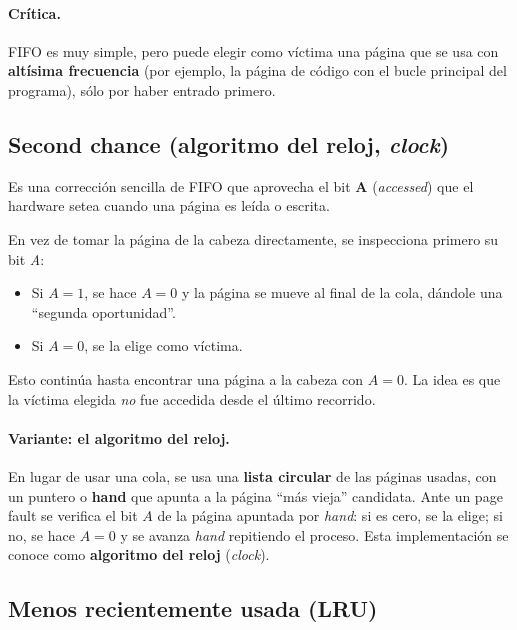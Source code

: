\documentclass[11pt,a4paper]{article}
\begin{document}
\paragraph{Crítica.}
FIFO es muy simple, pero puede elegir como víctima una página que se
usa con \textbf{altísima frecuencia} (por ejemplo, la página de código
con el bucle principal del programa), sólo por haber entrado primero.

\subsection{Second chance (algoritmo del reloj, \emph{clock})}

Es una corrección sencilla de FIFO que aprovecha el bit \textbf{A}
(\emph{accessed}) que el hardware setea cuando una página es leída o
escrita.

En vez de tomar la página de la cabeza directamente, se inspecciona
primero su bit \emph{A}:

\begin{itemize}[leftmargin=*]
    \item Si $A=1$, se hace $A=0$ y la página se mueve al final de la
        cola, dándole una ``segunda oportunidad''.
    \item Si $A=0$, se la elige como víctima.
\end{itemize}

Esto continúa hasta encontrar una página a la cabeza con $A=0$. La idea
es que la víctima elegida \emph{no} fue accedida desde el último
recorrido.

\paragraph{Variante: el algoritmo del reloj.}
En lugar de usar una cola, se usa una \textbf{lista circular} de las
páginas usadas, con un puntero o \textbf{hand} que apunta a la página
``más vieja'' candidata. Ante un page fault se verifica el bit $A$ de
la página apuntada por \emph{hand}: si es cero, se la elige; si no, se
hace $A=0$ y se avanza \emph{hand} repitiendo el proceso. Esta
implementación se conoce como \textbf{algoritmo del reloj}
(\emph{clock}).

\subsection{Menos recientemente usada (LRU)}
\end{document}
